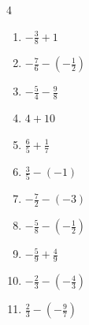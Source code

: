 \begin{multicols}{4}
\begin{enumerate}

  \item $\displaystyle -\frac{3}{8} + 1$


  \item $\displaystyle -\frac{7}{6} - \left(-\frac{1}{2}\right)$


  \item $\displaystyle -\frac{5}{4} - \frac{9}{8}$


  \item $\displaystyle 4 + 10$

        \phantom{$\displaystyle =14$}

  \item $\displaystyle \frac{6}{5} + \frac{1}{7}$


  \item $\displaystyle \frac{3}{5} - \left(-1\right)$


  \item $\displaystyle -\frac{7}{2} - \left(-3\right)$


  \item $\displaystyle -\frac{5}{8} - \left(-\frac{1}{2}\right)$


  \item $\displaystyle -\frac{5}{9} + \frac{4}{9}$


\columnbreak %

  \item $\displaystyle -\frac{2}{3} - \left(-\frac{4}{3}\right)$


  \item $\displaystyle \frac{2}{3} - \left(-\frac{9}{7}\right)$



\end{enumerate}
\end{multicols}
